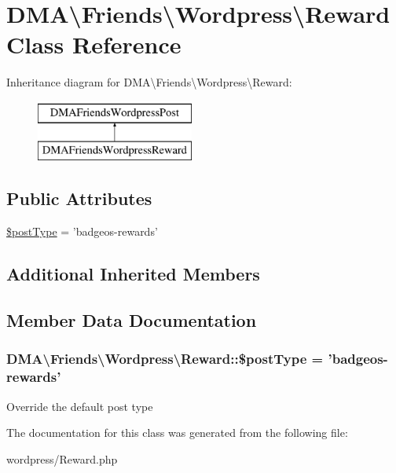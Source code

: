 \hypertarget{classDMA_1_1Friends_1_1Wordpress_1_1Reward}{\section{D\+M\+A\textbackslash{}Friends\textbackslash{}Wordpress\textbackslash{}Reward Class Reference}
\label{classDMA_1_1Friends_1_1Wordpress_1_1Reward}
}
Inheritance diagram for D\+M\+A\textbackslash{}Friends\textbackslash{}Wordpress\textbackslash{}Reward\+:\begin{figure}[H]
\begin{center}
\leavevmode
\includegraphics[height=2.000000cm]{d6/d94/classDMA_1_1Friends_1_1Wordpress_1_1Reward}
\end{center}
\end{figure}
\subsection*{Public Attributes}
\begin{DoxyCompactItemize}
\item 
\hyperlink{classDMA_1_1Friends_1_1Wordpress_1_1Reward_a653920c3f524beabf1ab4350ae09df69}{\$post\+Type} = 'badgeos-\/rewards'
\end{DoxyCompactItemize}
\subsection*{Additional Inherited Members}


\subsection{Member Data Documentation}
\hypertarget{classDMA_1_1Friends_1_1Wordpress_1_1Reward_a653920c3f524beabf1ab4350ae09df69}{
\subsubsection[{\$post\+Type}]{\setlength{\rightskip}{0pt plus 5cm}D\+M\+A\textbackslash{}\+Friends\textbackslash{}\+Wordpress\textbackslash{}\+Reward\+::\$post\+Type = 'badgeos-\/rewards'}}\label{classDMA_1_1Friends_1_1Wordpress_1_1Reward_a653920c3f524beabf1ab4350ae09df69}
Override the default post type 

The documentation for this class was generated from the following file\+:\begin{DoxyCompactItemize}
\item 
wordpress/Reward.\+php\end{DoxyCompactItemize}
